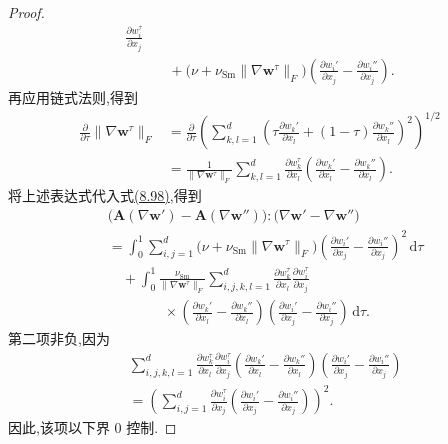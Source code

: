 \begin{lemma}[非线性黏性算子的强单调性]
\begin{proof}
\[\begin{aligned}
             \frac{\partial w_i^{\tau}}{\partial x_j}\\
 &\quad+\bigl(\nu+\nu_{\mathrm{Sm}}
             \|\nabla\bm{w}^{\tau}\|_F\bigr)
       \left(\frac{\partial w_i'}{\partial x_j}
                 -\frac{\partial w_i''}{\partial x_j}\right).
\end{aligned}
\]
再应用链式法则,得到
\[
\begin{aligned}
 \frac{\partial}{\partial\tau}\|\nabla\bm{w}^{\tau}\|_F
 &=\frac{\partial}{\partial\tau}
   \left(\sum_{k,l=1}^{d}
       \left(\tau\frac{\partial w_k'}{\partial x_l}
              +(1-\tau)\frac{\partial w_k''}{\partial x_l}\right)^2
   \right)^{1/2}\\
 &=\frac{1}{\|\nabla\bm{w}^{\tau}\|_F}
   \sum_{k,l=1}^{d}\frac{\partial w_k^{\tau}}{\partial x_l}
       \left(\frac{\partial w_k'}{\partial x_l}
                    -\frac{\partial w_k''}{\partial x_l}\right).
\end{aligned}
\]
将上述表达式代入式\hyperref[eq:smagorinsky-monotonicity-fundamental-theorem]{(8.98)},得到
\begin{equation}\label{eq:smagorinsky-monotonicity-expansion}
\begin{aligned}
 &\bigl(\bm{A}(\nabla\bm{w}')-\bm{A}(\nabla\bm{w}'')\bigr)
       :\bigl(\nabla\bm{w}'-\nabla\bm{w}''\bigr)\\
 &=\int_0^1\sum_{i,j=1}^{d}
       \bigl(\nu+\nu_{\mathrm{Sm}}\|\nabla\bm{w}^{\tau}\|_F\bigr)
       \left(\frac{\partial w_i'}{\partial x_j}
                    -\frac{\partial w_i''}{\partial x_j}\right)^2
                                               \,\mathrm{d}\tau\\
 &\quad+\int_0^1\frac{\nu_{\mathrm{Sm}}}
                    {\|\nabla\bm{w}^{\tau}\|_F}
       \sum_{i,j,k,l=1}^{d}
          \frac{\partial w_k^{\tau}}{\partial x_l}
          \frac{\partial w_i^{\tau}}{\partial x_j}\\
 &\qquad\qquad\times
       \left(\frac{\partial w_k'}{\partial x_l}
                    -\frac{\partial w_k''}{\partial x_l}\right)
       \left(\frac{\partial w_i'}{\partial x_j}
                    -\frac{\partial w_i''}{\partial x_j}\right)\,\mathrm{d}\tau.
\end{aligned}
\end{equation}
第二项非负,因为
\begin{equation}\label{eq:smagorinsky-monotonicity-square}
\begin{aligned}
 &\sum_{i,j,k,l=1}^{d}
   \frac{\partial w_k^{\tau}}{\partial x_l}
   \frac{\partial w_i^{\tau}}{\partial x_j}
   \left(\frac{\partial w_k'}{\partial x_l}
                    -\frac{\partial w_k''}{\partial x_l}\right)
   \left(\frac{\partial w_i'}{\partial x_j}
                    -\frac{\partial w_i''}{\partial x_j}\right)\\
 &=\left(\sum_{i,j=1}^{d}
     \frac{\partial w_i^{\tau}}{\partial x_j}
       \left(\frac{\partial w_i'}{\partial x_j}
                    -\frac{\partial w_i''}{\partial x_j}\right)
   \right)^2.
\end{aligned}
\end{equation}
因此,该项以下界 $0$ 控制.


\end{proof}
\end{lemma}
